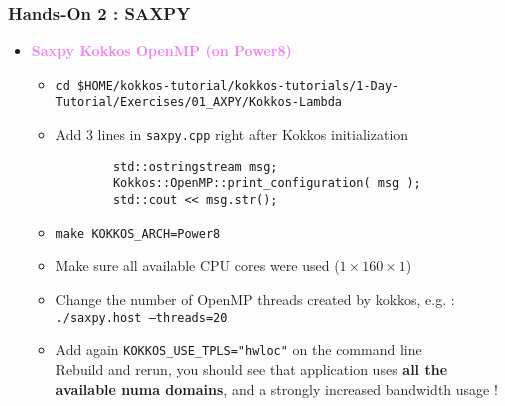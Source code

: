 \begin{frame}[fragile=singleslide]
  \frametitle{Hands-On 2 : SAXPY}

  \begin{itemize}
  \item \textcolor{violet}{\textbf{Saxpy Kokkos OpenMP (on Power8)}}    
    \begin{itemize}
    \item \texttt{cd \$HOME/kokkos-tutorial/kokkos-tutorials/1-Day-Tutorial/Exercises/01\_AXPY/Kokkos-Lambda}
    \item Add 3 lines in \texttt{saxpy.cpp} right after Kokkos initialization
      \begin{verbatim}
        std::ostringstream msg;
        Kokkos::OpenMP::print_configuration( msg );
        std::cout << msg.str();
      \end{verbatim}
    \item \texttt{make KOKKOS\_ARCH=Power8}
    \item Make sure all available CPU cores were used ($1\times 160 \times 1$)
    \item Change the number of OpenMP threads created by kokkos, e.g. :\\
      \texttt{./saxpy.host  --threads=20}
    \item Add again \texttt{KOKKOS\_USE\_TPLS="hwloc"} on the command line\\
      Rebuild and rerun, you should see that application uses \textbf{all the available numa domains}, and a strongly increased bandwidth usage !
    \end{itemize}
  \end{itemize}

\end{frame}

